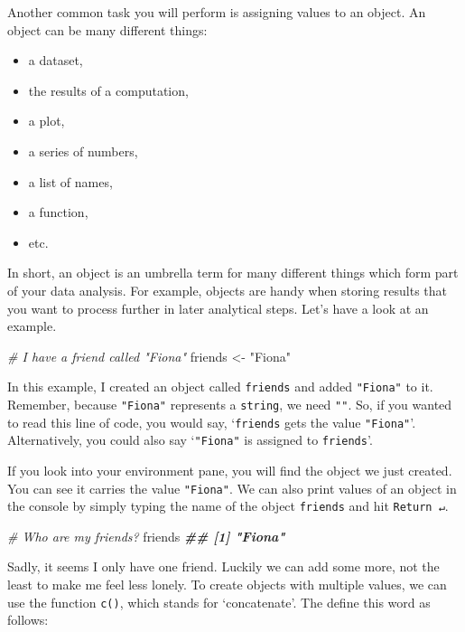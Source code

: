\documentclass[
]{book}
\newenvironment{Shaded}{\begin{snugshade}}{\end{snugshade}}
\newcommand{\CommentTok}[1]{\textcolor[rgb]{0.56,0.35,0.01}{\textit{#1}}}
\newcommand{\DocumentationTok}[1]{\textcolor[rgb]{0.56,0.35,0.01}{\textbf{\textit{#1}}}}
\newcommand{\NormalTok}[1]{#1}
\newcommand{\OtherTok}[1]{\textcolor[rgb]{0.56,0.35,0.01}{#1}}
\newcommand{\StringTok}[1]{\textcolor[rgb]{0.31,0.60,0.02}{#1}}
\begin{document}
Another common task you will perform is assigning values to an object. An object can be many different things:

\begin{itemize}
\item
  a dataset,
\item
  the results of a computation,
\item
  a plot,
\item
  a series of numbers,
\item
  a list of names,
\item
  a function,
\item
  etc.
\end{itemize}

In short, an object is an umbrella term for many different things which form part of your data analysis. For example, objects are handy when storing results that you want to process further in later analytical steps. Let's have a look at an example.

\begin{Shaded}
\begin{Highlighting}[]
\CommentTok{\# I have a friend called "Fiona"}
\NormalTok{friends }\OtherTok{\textless{}{-}} \StringTok{"Fiona"}
\end{Highlighting}
\end{Shaded}

In this example, I created an object called \texttt{friends} and added \texttt{"Fiona"} to it. Remember, because \texttt{"Fiona"} represents a \texttt{string}, we need \texttt{""}. So, if you wanted to read this line of code, you would say, `\texttt{friends} gets the value \texttt{"Fiona"}'. Alternatively, you could also say `\texttt{"Fiona"} is assigned to \texttt{friends}'.

If you look into your environment pane, you will find the object we just created. You can see it carries the value \texttt{"Fiona"}. We can also print values of an object in the console by simply typing the name of the object \texttt{friends} and hit \texttt{Return\ ↵}.

\begin{Shaded}
\begin{Highlighting}[]
\CommentTok{\# Who are my friends?}
\NormalTok{friends}
\DocumentationTok{\#\# [1] "Fiona"}
\end{Highlighting}
\end{Shaded}

Sadly, it seems I only have one friend. Luckily we can add some more, not the least to make me feel less lonely. To create objects with multiple values, we can use the function \texttt{c()}, which stands for `concatenate'. The \citet{concatenate-2021} define this word as follows:
\end{document}
